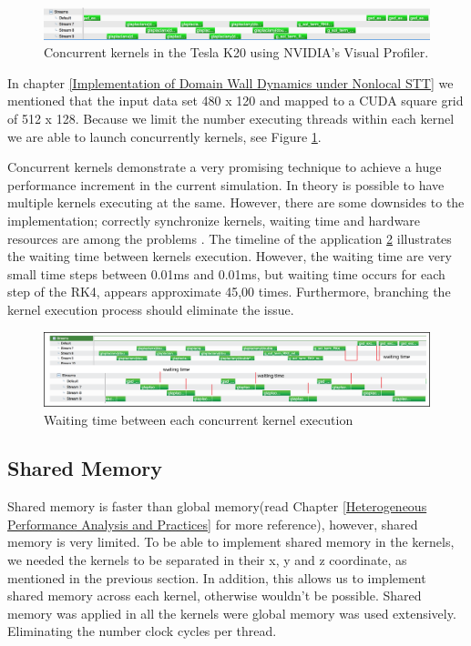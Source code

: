 \begin{figure}[htbp]
	\centering
		\includegraphics[width=1.0\textwidth]{Figures/concurent.png}
		\smallskip
	\caption[Streams kernels Tesla K20]{Concurrent kernels in the Tesla K20 using NVIDIA's Visual Profiler.}
	\label{fig:concurrent}
\end{figure}

In chapter \ref{Implementation of Domain Wall Dynamics under Nonlocal STT} we mentioned that the input data set 480 x 120 and mapped to a CUDA square grid of 512 x 128. Because we limit the number executing threads within each kernel we are able to launch concurrently kernels, see Figure  \ref{fig:concurrent}.

Concurrent kernels demonstrate a very promising technique to achieve a huge performance increment in the current simulation. In theory is possible to have multiple kernels executing at the same. However, there are some downsides to the implementation; correctly synchronize kernels, waiting time and hardware resources are among the  problems \cite{practices}. The timeline of the application \ref{fig:waittime} illustrates the waiting time between kernels execution. However, the waiting time are very small time steps between 0.01ms and 0.01ms, but waiting time occurs for each step of the RK4, appears approximate 45,00 times. Furthermore, branching the kernel execution process should eliminate the issue.

\begin{figure}[htbp]
	\centering
		\includegraphics[width=1.0\textwidth]{Figures/waittime.png}
		\smallskip
	\caption[Waiting time in concurrent kernels]{Waiting time between each concurrent kernel execution}
	\label{fig:waittime}
\end{figure}


\subsection{Shared Memory}

Shared memory is faster than global memory(read Chapter \ref{Heterogeneous Performance Analysis and Practices} for more reference), however, shared memory is very limited. To be able to implement shared memory in the kernels, we needed the kernels to be separated in their x, y and z coordinate, as mentioned in the previous section. In addition, this allows us to implement shared memory across each kernel, otherwise wouldn't be possible. Shared memory was applied in all the kernels were global memory was used extensively. Eliminating the number clock cycles per thread.

